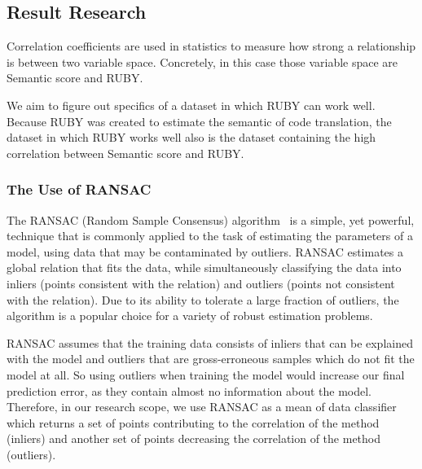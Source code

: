 \subsection{Result Research}

Correlation coefficients are used in statistics to measure how strong a relationship is between two variable space. Concretely, in this case those variable space are Semantic score and RUBY. 


We aim to figure out specifics of a dataset in which RUBY can work well. Because RUBY was created to estimate the semantic of code translation, the dataset in which RUBY works well also is the dataset containing the high correlation between Semantic score and RUBY. 

\subsubsection{The Use of RANSAC}
The RANSAC (Random Sample Consensus) algorithm~\cite{ Fischler:1981:RSC:358669.358692} is a simple, yet powerful, technique that is commonly applied to the task of estimating the parameters of a model, using data that may be contaminated by outliers. RANSAC estimates a global relation that fits the data, while simultaneously classifying the data into inliers (points consistent with the relation) and outliers (points not consistent with the relation). Due to its ability to tolerate a large fraction of outliers, the algorithm is a popular choice for a variety of robust estimation problems.


RANSAC assumes that the training data consists of inliers that can be explained with the model and outliers that are gross-erroneous samples which do not fit the model at all. So using outliers when training the model would increase our final prediction error, as they contain almost no information about the model. Therefore, in our research scope, we use RANSAC as a mean of data classifier which returns a set of points contributing to the correlation of the method (inliers) and another set of points decreasing the correlation of the method (outliers).

